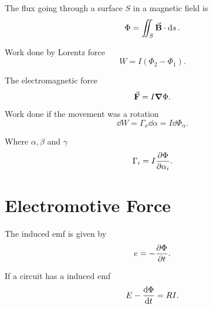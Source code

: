 The flux going through a surface $S$ in a magnetic field is
\[
	\Phi = \iint_S \va{B}\cdot\dd{s}
	.\]

Work done by Lorentz force
\[
	W = I(\Phi_2 - \Phi_1)
	.\]

The electromagnetic force
\[
	\va{F} = I \grad{\Phi}
	.\]

Work done if the movement was a rotation
\[
	\dd{W} = \Gamma_x\dd{\alpha} = I \dd{\Phi_\alpha}
	.\]

Where $\alpha, \beta$ and $\gamma$
\[
	\Gamma_i = I \pdv{\Phi}{\alpha_i}
	.\]

\section{Electromotive Force}

The induced emf is given by
\[
	e = -\pdv{\Phi}{t}
	.\]

If a circuit has a induced emf
\[
	E-\dv{\Phi}{t} = RI
	.\]


